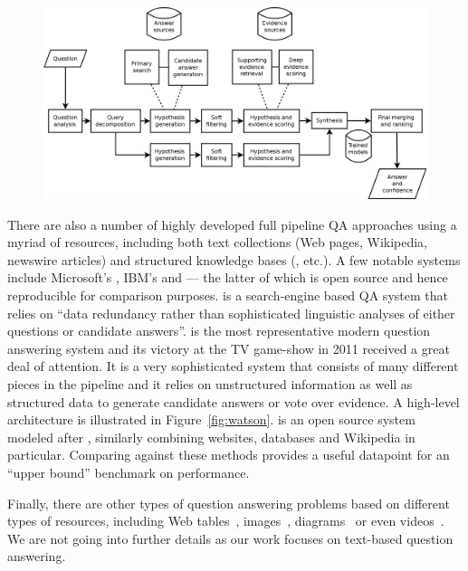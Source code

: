 \begin{figure}[t]
    \center
    \includegraphics[scale=0.25]{img/deepqa.png}
\end{figure}

There are also a number of highly developed full pipeline QA approaches using a myriad of resources, including both text collections (Web pages, Wikipedia, newswire articles) and structured knowledge bases (,  etc.). A few notable systems include Microsoft's  \cite{brill2002askmsr},
IBM's  \cite{ferrucci2010building} and  \cite{baudivs2015yodaqa} --- the latter of which is open source and hence reproducible for comparison purposes.  is a search-engine based QA system that relies on ``data redundancy rather than sophisticated linguistic analyses of either questions or candidate answers''.  is the most representative modern question answering system and its victory at the TV game-show  in 2011 received a great deal of attention. It is a very sophisticated system that consists of many different pieces in the pipeline and it relies on unstructured information as well as structured data to generate candidate answers or vote over evidence. A high-level architecture is illustrated in Figure~\ref{fig:watson}.  is an open source system modeled after , similarly combining websites, databases and Wikipedia in particular. Comparing against these methods provides a useful datapoint for an ``upper bound'' benchmark on performance.

Finally, there are other types of question answering problems based on different types of resources, including Web tables~\cite{pasupat2015compositional}, images~\cite{antol2015vqa}, diagrams~\cite{kembhavi2017you} or even videos~\cite{tapaswi2016movieqa}. We are not going into further details as our work focuses on text-based question answering.

